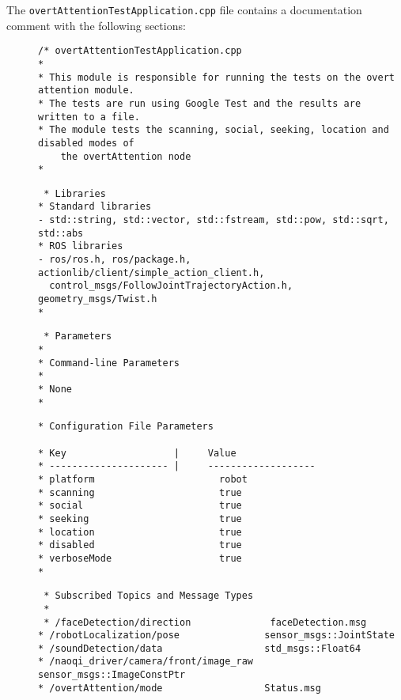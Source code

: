 \documentclass{CSSRforAfrica}
\newcommand{\checkboxChecked}{\fbox{\ding{51}}} %
\begin{document}
\noindent The {\small \verb+overtAttentionTestApplication.cpp+} file contains a documentation comment with the following sections:

\begin{description}

\item[\checkboxChecked] 
 {\small 
\begin{verbatim}
/* overtAttentionTestApplication.cpp
*
* This module is responsible for running the tests on the overt attention module.
* The tests are run using Google Test and the results are written to a file. 
* The module tests the scanning, social, seeking, location and disabled modes of 
    the overtAttention node
*
\end{verbatim}}

\item[\checkboxChecked] 
 {\small 
\begin{verbatim}
 * Libraries
* Standard libraries
- std::string, std::vector, std::fstream, std::pow, std::sqrt, std::abs
* ROS libraries
- ros/ros.h, ros/package.h, actionlib/client/simple_action_client.h, 
  control_msgs/FollowJointTrajectoryAction.h, geometry_msgs/Twist.h
*
\end{verbatim}}

\item[\checkboxChecked] 
 {\small 
\begin{verbatim}
 * Parameters
*
* Command-line Parameters
*
* None
*
\end{verbatim}}

\newpage
\item[\checkboxChecked] 
 {\small 
\begin{verbatim}
* Configuration File Parameters

* Key                   |     Value 
* --------------------- |     -------------------
* platform                      robot
* scanning                      true
* social                        true
* seeking                       true
* location                      true
* disabled                      true
* verboseMode                   true
*
\end{verbatim}}

\item[\checkboxChecked] 
 {\small 
\begin{verbatim}
 * Subscribed Topics and Message Types
 *
 * /faceDetection/direction              faceDetection.msg     
* /robotLocalization/pose               sensor_msgs::JointState
* /soundDetection/data                  std_msgs::Float64    
* /naoqi_driver/camera/front/image_raw  sensor_msgs::ImageConstPtr     
* /overtAttention/mode                  Status.msg  
\end{verbatim}}


\end{description}
\end{document}
